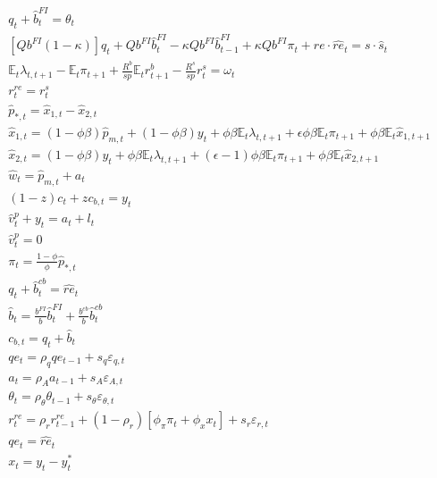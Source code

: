 \documentclass[10pt]{article}
\begin{document}
\begin{align*}
& q_{t}+\widehat{b}_{t}^{F I}=\theta_{t}  \tag{B.7}\\
& {\left[Q b^{F I}(1-\kappa)\right] q_{t}+Q b^{F I} \widehat{b}_{t}^{F I}-\kappa Q b^{F I} \widehat{b}_{t-1}^{F I}+\kappa Q b^{F I} \pi_{t}+r e \cdot \widehat{r e}{ }_{t}=s \cdot \widehat{s}_{t}}  \tag{B.8}\\
& \mathbb{E}_{t} \lambda_{t, t+1}-\mathbb{E}_{t} \pi_{t+1}+\frac{R^{b}}{s p} \mathbb{E}_{t} r_{t+1}^{b}-\frac{R^{s}}{s p} r_{t}^{s}=\omega_{t}  \tag{B.9}\\
& r_{t}^{r e}=r_{t}^{s}  \tag{B.10}\\
& \widehat{p}_{*, t}=\widehat{x}_{1, t}-\widehat{x}_{2, t}  \tag{B.11}\\
& \widehat{x}_{1, t}=(1-\phi \beta) \widehat{p}_{m, t}+(1-\phi \beta) y_{t}+\phi \beta \mathbb{E}_{t} \lambda_{t, t+1}+\epsilon \phi \beta \mathbb{E}_{t} \pi_{t+1}+\phi \beta \mathbb{E}_{t} \widehat{x}_{1, t+1}  \tag{B.12}\\
& \widehat{x}_{2, t}=(1-\phi \beta) y_{t}+\phi \beta \mathbb{E}_{t} \lambda_{t, t+1}+(\epsilon-1) \phi \beta \mathbb{E}_{t} \pi_{t+1}+\phi \beta \mathbb{E}_{t} \widehat{x}_{2, t+1}  \tag{B.13}\\
& \widehat{w}_{t}=\widehat{p}_{m, t}+a_{t}  \tag{B.14}\\
& (1-z) c_{t}+z c_{b, t}=y_{t}  \tag{B.15}\\
& \widehat{v}_{t}^{p}+y_{t}=a_{t}+l_{t}  \tag{B.16}\\
& \widehat{v}_{t}^{p}=0  \tag{B.17}\\
& \pi_{t}=\frac{1-\phi}{\phi} \widehat{p}_{*, t}  \tag{B.18}\\
& q_{t}+\widehat{b}_{t}^{c b}=\widehat{r e}_{t}  \tag{B.19}\\
& \widehat{b}_{t}=\frac{b^{F I}}{b} \widehat{b}_{t}^{F I}+\frac{b^{c b}}{b} \widehat{b}_{t}^{c b}  \tag{B.20}\\
& c_{b, t}=q_{t}+\widehat{b}_{t}  \tag{B.21}\\
& q e_{t}=\rho_{q} q e_{t-1}+s_{q} \varepsilon_{q, t}  \tag{B.22}\\
& a_{t}=\rho_{A} a_{t-1}+s_{A} \varepsilon_{A, t}  \tag{B.23}\\
& \theta_{t}=\rho_{\theta} \theta_{t-1}+s_{\theta} \varepsilon_{\theta, t}  \tag{B.24}\\
& r_{t}^{r e}=\rho_{r} r_{t-1}^{r e}+\left(1-\rho_{r}\right)\left[\phi_{\pi} \pi_{t}+\phi_{x} x_{t}\right]+s_{r} \varepsilon_{r, t}  \tag{B.25}\\
& q e_{t}=\widehat{r e}_{t}  \tag{B.26}\\
& x_{t}=y_{t}-y_{t}^{*} \tag{B.27}
\end{align*}
\end{document}
